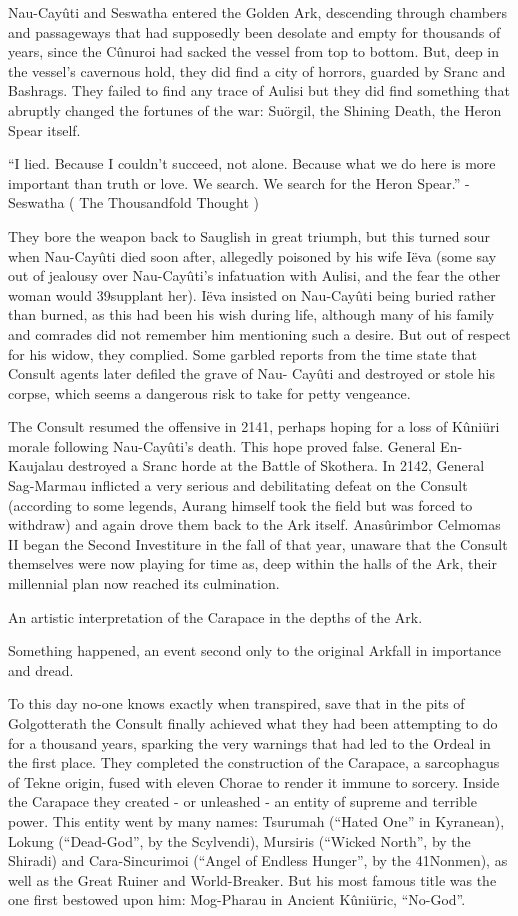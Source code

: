 \documentclass[]{book}
\begin{document}
Nau-Cayûti and Seswatha entered the Golden Ark, descending through chambers and
passageways that had supposedly been desolate and empty for thousands of years, since
the Cûnuroi had sacked the vessel from top to bottom. But, deep in the vessel's
cavernous hold, they did find a city of horrors, guarded by Sranc and Bashrags. They
failed to find any trace of Aulisi but they did find something that abruptly changed the
fortunes of the war: Suörgil, the Shining Death, the Heron Spear itself.

``I lied. Because I couldn't succeed, not alone. Because what we do here is more
important than truth or love. We search. We search for the Heron Spear.''
- Seswatha ( The Thousandfold Thought )

They bore the weapon back to Sauglish in great triumph, but this turned sour when
Nau-Cayûti died soon after, allegedly poisoned by his wife Iëva (some say out of jealousy
over Nau-Cayûti's infatuation with Aulisi, and the fear the other woman would
39supplant her). Iëva insisted on Nau-Cayûti being buried rather than burned, as this had
been his wish during life, although many of his family and comrades did not remember
him mentioning such a desire. But out of respect for his widow, they complied. Some
garbled reports from the time state that Consult agents later defiled the grave of Nau-
Cayûti and destroyed or stole his corpse, which seems a dangerous risk to take for petty
vengeance.

The Consult resumed the offensive in 2141, perhaps hoping for a loss of Kûniüri
morale following Nau-Cayûti's death. This hope proved false. General En-Kaujalau
destroyed a Sranc horde at the Battle of Skothera. In 2142, General Sag-Marmau
inflicted a very serious and debilitating defeat on the Consult (according to some
legends, Aurang himself took the field but was forced to withdraw) and again drove
them back to the Ark itself. Anasûrimbor Celmomas II began the Second Investiture in
the fall of that year, unaware that the Consult themselves were now playing for time as,
deep within the halls of the Ark, their millennial plan now reached its culmination.

An artistic interpretation of the Carapace in the depths of the Ark.

Something happened, an event second only to the original Arkfall in importance and
dread.

To this day no-one knows exactly when transpired, save that in the pits of Golgotterath
the Consult finally achieved what they had been attempting to do for a thousand years,
sparking the very warnings that had led to the Ordeal in the first place. They completed
the construction of the Carapace, a sarcophagus of Tekne origin, fused with eleven
Chorae to render it immune to sorcery. Inside the Carapace they created - or unleashed
- an entity of supreme and terrible power. This entity went by many names: Tsurumah
(``Hated One'' in Kyranean), Lokung (``Dead-God'', by the Scylvendi), Mursiris (``Wicked
North'', by the Shiradi) and Cara-Sincurimoi (``Angel of Endless Hunger'', by the
41Nonmen), as well as the Great Ruiner and World-Breaker. But his most famous title
was the one first bestowed upon him: Mog-Pharau in Ancient Kûniüric, ``No-God''.
\end{document}
